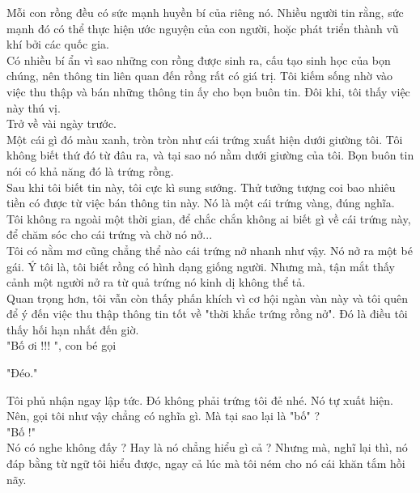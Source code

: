 \documentclass[13pt]{extarticle}
\begin{document}
	Mỗi con rồng đều có sức mạnh huyền bí của riêng nó. Nhiều người tin rằng, sức mạnh đó có thể thực hiện ước nguyện của con người, hoặc phát triển thành vũ khí bởi các quốc gia. \\
	
	Có nhiều bí ẩn vì sao những con rồng được sinh ra, cấu tạo sinh học của bọn chúng, nên thông tin liên quan đến rồng rất có giá trị. Tôi kiếm sống nhờ vào việc thu thập và bán những thông tin ấy cho bọn buôn tin. Đôi khi, tôi thấy việc này thú vị. \\
	
	Trở về vài ngày trước. \\
	
	Một cái gì đó màu xanh, tròn tròn như cái trứng xuất hiện dưới giường tôi. Tôi không biết thứ đó từ đâu ra, và tại sao nó nằm dưới giường của tôi. Bọn buôn tin nói có khả năng đó là trứng rồng. \\ 
	
	Sau khi tôi biết tin này, tôi cực kì sung sướng. Thử tưởng tượng coi bao nhiêu tiền có được từ việc bán thông tin này. Nó là một cái trứng vàng, đúng nghĩa. Tôi không ra ngoài một thời gian, để chắc chắn không ai biết gì về cái trứng này, để chăm sóc cho cái trứng và chờ nó nở... \\
	
	Tôi có nằm mơ cũng chẳng thể nào cái trứng nở nhanh như vậy. Nó nở ra một bé gái. Ý tôi là, tôi biết rồng có hình dạng giống người. Nhưng mà, tận mắt thấy cảnh một người nở ra từ quả trứng nó kinh dị không thể tả. \\
	
	Quan trọng hơn, tôi vẫn còn thấy phấn khích vì cơ hội ngàn vàn này và tôi quên để ý đến việc thu thập thông tin tốt về "thời khắc trứng rồng nở". Đó là điều tôi thấy hối hạn nhất đến giờ. \\
	
	"Bố ơi !!! ", con bé gọi
	
	"Đéo." 
	
	Tôi phủ nhận ngay lập tức. Đó không phải trứng tôi đẻ nhé. Nó tự xuất hiện. Nên, gọi tôi như vậy chẳng có nghĩa gì. Mà tại sao lại là "bố" ? \\
	
	"Bố !"\\
	
	Nó có nghe không đấy ? Hay là nó chẳng hiểu gì cả ? Nhưng mà, nghĩ lại thì, nó đáp bằng từ ngữ tôi hiểu được, ngay cả lúc mà tôi ném cho nó cái khăn tắm hồi nãy. \\
	
\end{document}
